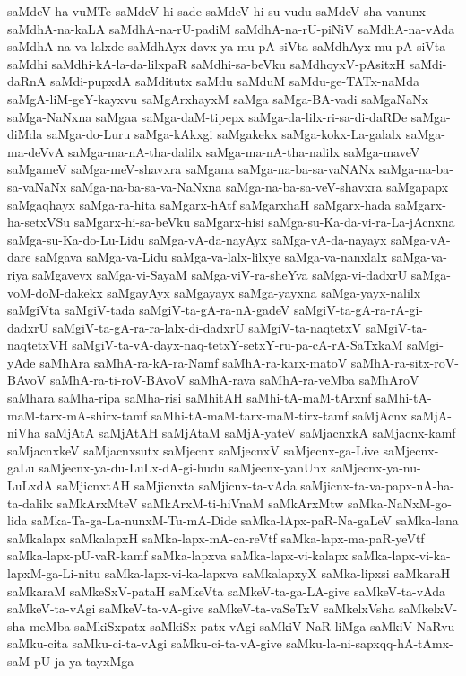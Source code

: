 {saMdeV-ha-vuMTe
saMdeV-hi-sade
saMdeV-hi-su-vudu
saMdeV-sha-vanunx
saMdhA-na-kaLA
saMdhA-na-rU-padiM
saMdhA-na-rU-piNiV
saMdhA-na-vAda
saMdhA-na-va-lalxde
saMdhAyx-davx-ya-mu-pA-siVta
saMdhAyx-mu-pA-siVta
saMdhi
saMdhi-kA-la-da-lilxpaR
saMdhi-sa-beVku
saMdhoyxV-pAsitxH
saMdi-daRnA
saMdi-pupxdA
saMditutx
saMdu
saMduM
saMdu-ge-TATx-naMda
saMgA-liM-geY-kayxvu
saMgArxhayxM
saMga
saMga-BA-vadi
saMgaNaNx
saMga-NaNxna
saMgaa
saMga-daM-tipepx
saMga-da-lilx-ri-sa-di-daRDe
saMga-diMda
saMga-do-Luru
saMga-kAkxgi
saMgakekx
saMga-kokx-La-galalx
saMga-ma-deVvA
saMga-ma-nA-tha-dalilx
saMga-ma-nA-tha-nalilx
saMga-maveV
saMgameV
saMga-meV-shavxra
saMgana
saMga-na-ba-sa-vaNANx
saMga-na-ba-sa-vaNaNx
saMga-na-ba-sa-va-NaNxna
saMga-na-ba-sa-veV-shavxra
saMgapapx
saMgaqhayx
saMga-ra-hita
saMgarx-hAtf
saMgarxhaH
saMgarx-hada
saMgarx-ha-setxVSu
saMgarx-hi-sa-beVku
saMgarx-hisi
saMga-su-Ka-da-vi-ra-La-jAcnxna
saMga-su-Ka-do-Lu-Lidu
saMga-vA-da-nayAyx
saMga-vA-da-nayayx
saMga-vA-dare
saMgava
saMga-va-Lidu
saMga-va-lalx-lilxye
saMga-va-nanxlalx
saMga-va-riya
saMgavevx
saMga-vi-SayaM
saMga-viV-ra-sheYva
saMga-vi-dadxrU
saMga-voM-doM-dakekx
saMgayAyx
saMgayayx
saMga-yayxna
saMga-yayx-nalilx
saMgiVta
saMgiV-tada
saMgiV-ta-gA-ra-nA-gadeV
saMgiV-ta-gA-ra-rA-gi-dadxrU
saMgiV-ta-gA-ra-ra-lalx-di-dadxrU
saMgiV-ta-naqtetxV
saMgiV-ta-naqtetxVH
saMgiV-ta-vA-dayx-naq-tetxY-setxY-ru-pa-cA-rA-SaTxkaM
saMgi-yAde
saMhAra
saMhA-ra-kA-ra-Namf
saMhA-ra-karx-matoV
saMhA-ra-sitx-roV-BAvoV
saMhA-ra-ti-roV-BAvoV
saMhA-rava
saMhA-ra-veMba
saMhAroV
saMhara
saMha-ripa
saMha-risi
saMhitAH
saMhi-tA-maM-tArxnf
saMhi-tA-maM-tarx-mA-shirx-tamf
saMhi-tA-maM-tarx-maM-tirx-tamf
saMjAcnx
saMjA-niVha
saMjAtA
saMjAtAH
saMjAtaM
saMjA-yateV
saMjacnxkA
saMjacnx-kamf
saMjacnxkeV
saMjacnxsutx
saMjecnx
saMjecnxV
saMjecnx-ga-Live
saMjecnx-gaLu
saMjecnx-ya-du-LuLx-dA-gi-hudu
saMjecnx-yanUnx
saMjecnx-ya-nu-LuLxdA
saMjicnxtAH
saMjicnxta
saMjicnx-ta-vAda
saMjicnx-ta-va-papx-nA-ha-ta-dalilx
saMkArxMteV
saMkArxM-ti-hiVnaM
saMkArxMtw
saMka-NaNxM-go-lida
saMka-Ta-ga-La-nunxM-Tu-mA-Dide
saMka-lApx-paR-Na-gaLeV
saMka-lana
saMkalapx
saMkalapxH
saMka-lapx-mA-ca-reVtf
saMka-lapx-ma-paR-yeVtf
saMka-lapx-pU-vaR-kamf
saMka-lapxva
saMka-lapx-vi-kalapx
saMka-lapx-vi-ka-lapxM-ga-Li-nitu
saMka-lapx-vi-ka-lapxva
saMkalapxyX
saMka-lipxsi
saMkaraH
saMkaraM
saMkeSxV-pataH
saMkeVta
saMkeV-ta-ga-LA-give
saMkeV-ta-vAda
saMkeV-ta-vAgi
saMkeV-ta-vA-give
saMkeV-ta-vaSeTxV
saMkelxVsha
saMkelxV-sha-meMba
saMkiSxpatx
saMkiSx-patx-vAgi
saMkiV-NaR-liMga
saMkiV-NaRvu
saMku-cita
saMku-ci-ta-vAgi
saMku-ci-ta-vA-give
saMku-la-ni-sapxqq-hA-tAmx-saM-pU-ja-ya-tayxMga
}
